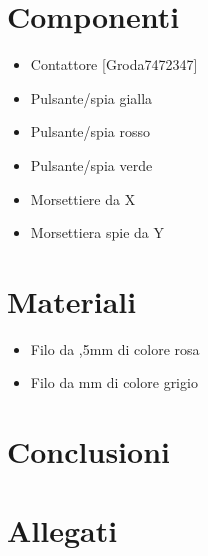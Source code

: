 \documentclass[12pt]{article}
\begin{document}
\section{Componenti}
\label{Componenti}
\begin{itemize}
    \item Contattore [Groda7472347]
    \item Pulsante/spia gialla 
    \item Pulsante/spia rosso
    \item Pulsante/spia verde 
    \item Morsettiere da X
    \item Morsettiera spie da Y
\end{itemize}
\section{Materiali}
\begin{itemize}
    \item Filo da ,5mm  di colore rosa
    \item Filo da  mm  di colore grigio
\end{itemize}
\section{Conclusioni}

\newpage
\section{Allegati}
\end{document}
